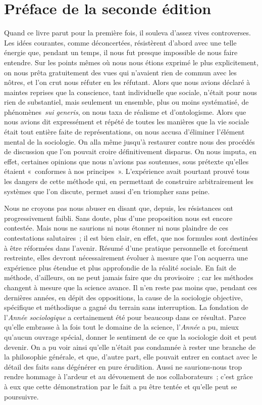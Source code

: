 \documentclass[french,twoside]{book} %
\begin{document}
\section[{Préface de la seconde édition}]{Préface de la seconde édition}\renewcommand{\leftmark}{Préface de la seconde édition}

\noindent Quand ce livre parut pour la première fois, il souleva d’assez vives controverses. Les idées courantes, comme déconcertées, résistèrent d’abord avec une telle énergie que, pendant un temps, il nous fut presque impossible de nous faire entendre. Sur les points mêmes où nous nous étions exprimé le plus explicitement, on nous prêta gratuitement des vues qui n’avaient rien de commun avec les nôtres, et l’on crut nous réfuter en les réfutant. Alors que nous avions déclaré à maintes reprises que la conscience, tant individuelle que sociale, n’était pour nous rien de substantiel, mais seulement un ensemble, plus ou moins systématisé, de phénomènes {\itshape sui generis}, on nous taxa de réalisme et d’ontologisme. Alors que nous avions dit expressément et répété de toutes les manières que la vie sociale était tout entière faite de représentations, on nous accusa d’éliminer l’élément mental de la sociologie. On alla même jusqu’à restaurer contre nous des procédés de discussion que l’on pouvait croire définitivement disparus. On nous imputa, en effet, certaines opinions que nous n’avions pas soutenues, sous prétexte qu’elles étaient « conformes à nos principes ». L’expérience avait pourtant prouvé tous les dangers de cette méthode qui, en permettant de construire arbitrairement les systèmes que l’on discute, permet aussi d’en triompher sans peine.\par
Nous ne croyons pas nous abuser en disant que, depuis, les résistances ont progressivement faibli. Sans doute, plus d’une proposition nous est encore contestée. Mais nous ne saurions ni nous étonner ni nous plaindre de ces contestations salutaires ; il est bien clair, en effet, que nos formules sont destinées à être réformées dans l’avenir. Résumé d’une pratique personnelle et forcément restreinte, elles devront nécessairement évoluer à mesure que l’on acquerra une expérience plus étendue et plus approfondie de la réalité sociale. En fait de méthode, d’ailleurs, on ne peut jamais faire que du provisoire ; car les méthodes changent à mesure que la science avance. Il n’en reste pas moins que, pendant ces dernières années, en dépit des oppositions, la cause de la sociologie objective, spécifique et méthodique a gagné du terrain sans interruption. La fondation de l’\emph{Année sociologique} a certainement été pour beaucoup dans ce résultat. Parce qu’elle embrasse à la fois tout le domaine de la science, l’\emph{Année} a pu, mieux qu’aucun ouvrage spécial, donner le sentiment de ce que la sociologie doit et peut devenir. On a pu voir ainsi qu’elle n’était pas condamnée à rester une branche de la philosophie générale, et que, d’autre part, elle pouvait entrer en contact avec le détail des faits sans dégénérer en pure érudition. Aussi ne saurions-nous trop rendre hommage à l’ardeur et au dévouement de nos collaborateurs ; c’est grâce à eux que cette démonstration par le fait a pu être tentée et qu’elle peut se poursuivre.\par
\end{document}

